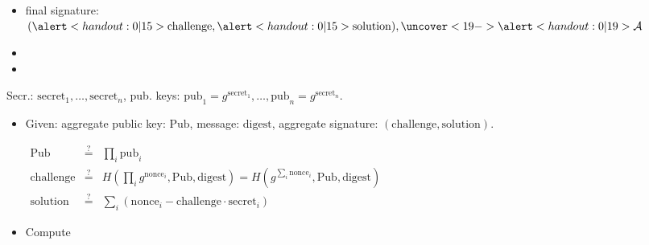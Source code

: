 \begin{frame}
\begin{emptyTheorem}
\begin{itemize}
\item<15->  final signature: $(\alertNoH{15}{ \mathrm{challenge}} , \alertNoH{15}{ \mathrm{solution}}), \uncover<19->{\alertNoH{19}{\mathcal A}}$
\end{itemize}
\end{emptyTheorem}
\vskip -0.15cm
\begin{itemize}
\item<19-> 
\item<20-> 
\end{itemize}
\vskip 15cm
\end{frame}

\begin{frame}
Secr.: $\mathrm{secret}_1, \dots, \mathrm{secret}_n$, pub. keys: $\mathrm{pub}_1 = g^{ \mathrm{secret }_1 }, \dots, \mathrm{pub}_n= g^{\mathrm{secret}_n}$.

\begin{emptyTheorem}
\begin{itemize}
\item Given: aggregate public key: $\mathrm{Pub} $, message: $\mathrm{digest}$, aggregate signature: $(\mathrm{challenge}, \mathrm{solution})$.

\vskip -0.25cm
\hfil\hfil$
\begin{array}{rcl}
\mathrm{Pub}&\stackrel{?}{=}& \prod_i \mathrm{pub}_i\\
\mathrm{challenge} &\stackrel{?}{=}& H\left( \prod_i g^{\mathrm{nonce}_i}, \mathrm{Pub}, \mathrm{digest} \right) = H\left( g^{\sum_i \mathrm{nonce}_i}, \mathrm{Pub}, \mathrm{digest} \right)  \\
\mathrm{solution} &\stackrel{?}{=}& \sum _i \left(\mathrm{nonce}_i - \mathrm{challenge}\cdot \mathrm{secret}_i \right)
\end{array}
$
\item Compute


\end{itemize}
\end{emptyTheorem}
\end{frame}
